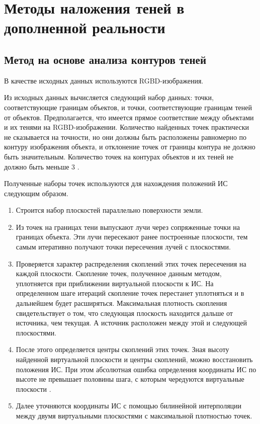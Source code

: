 \section{Методы наложения теней в дополненной реальности}

\subsection{Метод на основе анализа контуров теней}

В качестве исходных данных используются RGBD-изображения.

Из исходных данных вычисляется следующий набор данных: точки, соответствующие границам объектов, и точки, соответствующие границам теней от объектов. Предполагается, что имеется прямое соответствие между объектами и их тенями на RGBD-изображении. Количество найденных точек практически не сказывается на точности, но они должны быть расположены равномерно по контуру изображения объекта, и отклонение точек от границы контура не должно быть значительным. Количество точек на контурах объектов и их теней не должно быть меньше 3 \cite{shadow_contours_method}.

Полученные наборы точек используются для нахождения положений ИС следующим образом. 

\begin{enumerate}
	\item Строится набор плоскостей параллельно поверхности земли.
	\item Из точек на границах тени выпускают лучи через сопряженные точки на границах объекта. Эти лучи пересекают ранее построенные плоскости, тем самым итеративно получают точки пересечения лучей с плоскостями.
	\item Проверяется характер распределения скоплений этих точек пересечения на каждой плоскости. Скопление точек, полученное данным методом, уплотняется при приближении виртуальной плоскости к ИС. На определенном шаге итераций скопление точек перестанет уплотняться и в дальнейшем будет расширяться. Максимальная плотность скопления свидетельствует о том, что следующая плоскость находится дальше от источника, чем текущая. А источник расположен между этой и следующей плоскостями.
	\item После этого определяется центры скоплений этих точек. Зная высоту найденной виртуальной плоскости и центры скоплений, можно восстановить положения ИС.	При этом абсолютная ошибка определения координаты ИС по высоте не превышает половины шага, с которым чередуются виртуальные плоскости  \cite{shadow_contours_method}.
	\item Далее уточняются координаты ИС с помощью билинейной интерполяции между двумя виртуальными плоскостями с максимальной плотностью точек.
\end{enumerate}

